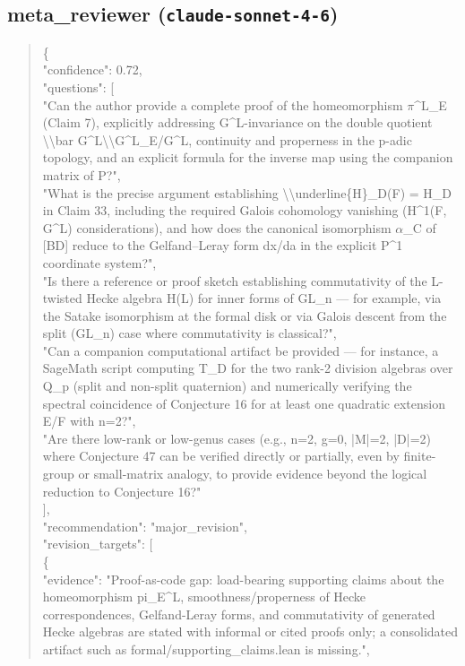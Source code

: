 \documentclass[11pt]{article}
\begin{document}
\subsection*{meta\_reviewer (\texttt{claude-sonnet-4-6})}
\begin{quote}\small\ttfamily\raggedright
\{\\
  "confidence": 0.72,\\
  "questions": [\\
    "Can the author provide a complete proof of the homeomorphism \ensuremath{\pi}\^{}L\_E (Claim 7), explicitly addressing G\^{}L-invariance on the double quotient \textbackslash{}\textbackslash{}bar G\^{}L\textbackslash{}\textbackslash{}G\^{}L\_E/G\^{}L, continuity and properness in the p-adic topology, and an explicit formula for the inverse map using the companion matrix of P?",\\
    "What is the precise argument establishing \textbackslash{}\textbackslash{}underline\{H\}\_D(F) = H\_D in Claim 33, including the required Galois cohomology vanishing (H\^{}1(F, G\^{}L) considerations), and how does the canonical isomorphism \ensuremath{\alpha}\_C of [BD] reduce to the Gelfand--Leray form dx/da in the explicit P\^{}1 coordinate system?",\\
    "Is there a reference or proof sketch establishing commutativity of the L-twisted Hecke algebra H(L) for inner forms of GL\_n --- for example, via the Satake isomorphism at the formal disk or via Galois descent from the split (GL\_n) case where commutativity is classical?",\\
    "Can a companion computational artifact be provided --- for instance, a SageMath script computing T\_D for the two rank-2 division algebras over Q\_p (split and non-split quaternion) and numerically verifying the spectral coincidence of Conjecture 16 for at least one quadratic extension E/F with n=2?",\\
    "Are there low-rank or low-genus cases (e.g., n=2, g=0, |M|=2, |D|=2) where Conjecture 47 can be verified directly or partially, even by finite-group or small-matrix analogy, to provide evidence beyond the logical reduction to Conjecture 16?"\\
  ],\\
  "recommendation": "major\_revision",\\
  "revision\_targets": [\\
    \{\\
      "evidence": "Proof-as-code gap: load-bearing supporting claims about the homeomorphism pi\_E\^{}L, smoothness/properness of Hecke correspondences, Gelfand-Leray forms, and commutativity of generated Hecke algebras are stated with informal or cited proofs only; a consolidated artifact such as formal/supporting\_claims.lean is missing.",\\

\end{quote}
\end{document}
